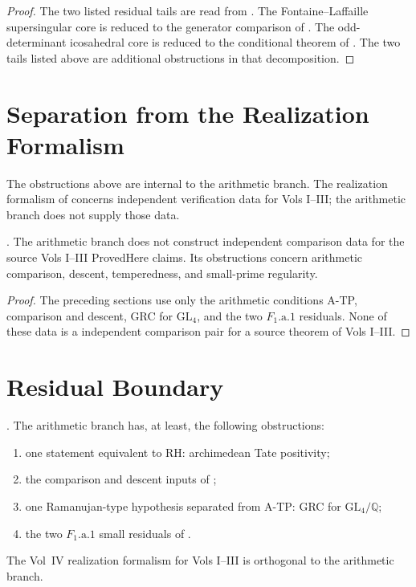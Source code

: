 \begin{proof}
The two listed residual tails are read from
. The Fontaine--Laffaille
supersingular core is reduced to the generator comparison of
. The odd-determinant icosahedral
core is reduced to the conditional theorem of
. The two tails listed above are
additional obstructions in that decomposition.
\end{proof}

\section{Separation from the Realization Formalism}
\label{v4-arith:w10-final:tier4}

The obstructions above are internal to the arithmetic branch. The
realization formalism of  concerns
independent verification data for Vols I--III; the arithmetic branch
does not supply those data.

\begin{proposition}
\label{v4-arith:w10-final:prop:hziv-separate}
\ClaimStatusProvedHere. The arithmetic branch does not construct
independent comparison data for the source Vols I--III
ProvedHere claims. Its obstructions concern arithmetic comparison,
descent, temperedness, and small-prime regularity.
\end{proposition}

\begin{proof}
The preceding sections use only the arithmetic conditions A-TP,
comparison and descent, GRC for \(\mathrm{GL}_{4}\), and the two
\(F_{1}\text{.a.1}\) residuals. None of these data is a
independent comparison pair for a source theorem of Vols I--III.
\end{proof}

\section{Residual Boundary}
\label{v4-arith:w10-final:residual-boundary}

\begin{theorem}
\label{v4-arith:w10-final:thm:near-closure}
\ClaimStatusProvedHere. The arithmetic branch has, at least, the
following obstructions:
\begin{enumerate}
\item one statement equivalent to RH: archimedean Tate positivity;
\item the comparison and descent inputs of
;
\item one Ramanujan-type hypothesis separated from A-TP: GRC for
\(\mathrm{GL}_{4}/\mathbb{Q}\);
\item the two \(F_{1}\text{.a.1}\) small residuals of
.
\end{enumerate}
The Vol~IV realization formalism for Vols I--III is orthogonal to the
arithmetic branch.
\end{theorem}

